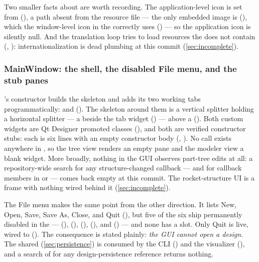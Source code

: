 Two smaller facts about  are worth recording. The application-level icon is
set from  (), a path absent from the
resource file --- the only embedded image is 
(), which the window-level icon in the  correctly uses
() --- so the application icon is silently null. And the
translation loop tries to load  resources the  does not contain
(, ): internationalization is dead plumbing
at this commit (\cref{sec:incomplete}).

\subsubsection{MainWindow: the shell, the disabled File menu, and the stub panes}
\label{sec:interfaces-gui-mainwindow}

's constructor builds the  skeleton and adds its two working tabs
programmatically:  and 
(). The skeleton around them is a vertical splitter holding a
horizontal splitter --- a  beside the tab widget
() --- above a 
(). Both custom widgets are Qt Designer promoted classes
(), and both are verified constructor stubs: each  is
six lines with an empty constructor body (,
). No  call exists anywhere in ,
so the tree view renders an empty pane and the modeler view a blank widget. More broadly,
nothing in the GUI observes part-tree edits at all: a repository-wide search for any
structure-changed callback --- and for callback members in  or
 --- comes back empty at this commit. The rocket-structure UI is
a frame with nothing wired behind it (\cref{sec:incomplete}).

The File menu makes the same point from the other direction. It lists New, Open, Save, Save
As, Close, and Quit (), but five of the six ship permanently
disabled in the  ---  (),
 (), 
(),  (), and
 () --- and none has a slot. Only Quit is
live, wired to  (). The consequence is stated
plainly: \emph{the GUI cannot open a  design}. The shared
 (\cref{sec:persistence}) is consumed by the CLI
() and the visualizer (), and
a search of  for any design-persistence reference returns nothing.

